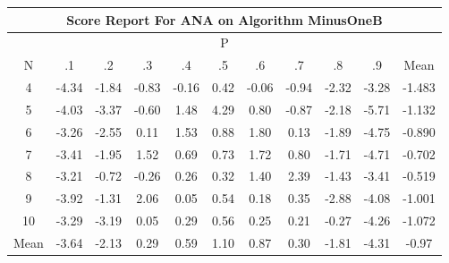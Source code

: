\documentclass[11pt,a4paper]{report}
\begin{document}
\begin{longtable}{ | c || c | c | c | c | c | c | c | c | c || c |}
\hline
\multicolumn{11}{|c|}{ Score Report For ANA on Algorithm MinusOneB} \\
\hline
\multicolumn{11}{|c|}{ P } \\
\hline
N & .1 & .2 & .3 & .4 & .5 & .6 & .7 & .8 & .9 & Mean\\
 \hline
 \hline
 \endhead
  4 &  \cellcolor[HTML]{FF8F8F} -4.34 &  \cellcolor[HTML]{FFCFCF} -1.84 &  \cellcolor[HTML]{FFE7E7} -0.83 &  \cellcolor[HTML]{FFF7F7} -0.16 &  \cellcolor[HTML]{F7F7FF} 0.42 &  \cellcolor[HTML]{FFFFFF} -0.06 &  \cellcolor[HTML]{FFE7E7} -0.94 &  \cellcolor[HTML]{FFC7C7} -2.32 &  \cellcolor[HTML]{FFAFAF} -3.28 & -1.483 \\
  5 &  \cellcolor[HTML]{FF9797} -4.03 &  \cellcolor[HTML]{FFA7A7} -3.37 &  \cellcolor[HTML]{FFEFEF} -0.60 &  \cellcolor[HTML]{D7D7FF} 1.48 &  \cellcolor[HTML]{9797FF} 4.29 &  \cellcolor[HTML]{E7E7FF} 0.80 &  \cellcolor[HTML]{FFE7E7} -0.87 &  \cellcolor[HTML]{FFC7C7} -2.18 &  \cellcolor[HTML]{FF7070} -5.71 & -1.132 \\
  6 &  \cellcolor[HTML]{FFAFAF} -3.26 &  \cellcolor[HTML]{FFBFBF} -2.55 &  \cellcolor[HTML]{FFFFFF} 0.11 &  \cellcolor[HTML]{D7D7FF} 1.53 &  \cellcolor[HTML]{E7E7FF} 0.88 &  \cellcolor[HTML]{CFCFFF} 1.80 &  \cellcolor[HTML]{FFFFFF} 0.13 &  \cellcolor[HTML]{FFCFCF} -1.89 &  \cellcolor[HTML]{FF8787} -4.75 & -0.890 \\
  7 &  \cellcolor[HTML]{FFA7A7} -3.41 &  \cellcolor[HTML]{FFCFCF} -1.95 &  \cellcolor[HTML]{D7D7FF} 1.52 &  \cellcolor[HTML]{EFEFFF} 0.69 &  \cellcolor[HTML]{EFEFFF} 0.73 &  \cellcolor[HTML]{D7D7FF} 1.72 &  \cellcolor[HTML]{E7E7FF} 0.80 &  \cellcolor[HTML]{FFD7D7} -1.71 &  \cellcolor[HTML]{FF8787} -4.71 & -0.702 \\
  8 &  \cellcolor[HTML]{FFAFAF} -3.21 &  \cellcolor[HTML]{FFEFEF} -0.72 &  \cellcolor[HTML]{FFF7F7} -0.26 &  \cellcolor[HTML]{F7F7FF} 0.26 &  \cellcolor[HTML]{F7F7FF} 0.32 &  \cellcolor[HTML]{DFDFFF} 1.40 &  \cellcolor[HTML]{BFBFFF} 2.39 &  \cellcolor[HTML]{FFD7D7} -1.43 &  \cellcolor[HTML]{FFA7A7} -3.41 & -0.519 \\
  9 &  \cellcolor[HTML]{FF9F9F} -3.92 &  \cellcolor[HTML]{FFDFDF} -1.31 &  \cellcolor[HTML]{C7C7FF} 2.06 &  \cellcolor[HTML]{FFFFFF} 0.05 &  \cellcolor[HTML]{EFEFFF} 0.54 &  \cellcolor[HTML]{F7F7FF} 0.18 &  \cellcolor[HTML]{F7F7FF} 0.35 &  \cellcolor[HTML]{FFB7B7} -2.88 &  \cellcolor[HTML]{FF9797} -4.08 & -1.001 \\
  10 &  \cellcolor[HTML]{FFAFAF} -3.29 &  \cellcolor[HTML]{FFAFAF} -3.19 &  \cellcolor[HTML]{FFFFFF} 0.05 &  \cellcolor[HTML]{F7F7FF} 0.29 &  \cellcolor[HTML]{EFEFFF} 0.56 &  \cellcolor[HTML]{F7F7FF} 0.25 &  \cellcolor[HTML]{F7F7FF} 0.21 &  \cellcolor[HTML]{FFF7F7} -0.27 &  \cellcolor[HTML]{FF9797} -4.26 & -1.072 \\
 \hline
 \hline
Mean &  \cellcolor[HTML]{FFA7A7} -3.64 &  \cellcolor[HTML]{FFC7C7} -2.13 &  \cellcolor[HTML]{F7F7FF} 0.29 &  \cellcolor[HTML]{EFEFFF} 0.59 &  \cellcolor[HTML]{E7E7FF} 1.10 &  \cellcolor[HTML]{E7E7FF} 0.87 &  \cellcolor[HTML]{F7F7FF} 0.30 &  \cellcolor[HTML]{FFCFCF} -1.81 &  \cellcolor[HTML]{FF8F8F} -4.31 &  \cellcolor[HTML]{FFE7E7} -0.97
\end{longtable}
\end{document}
